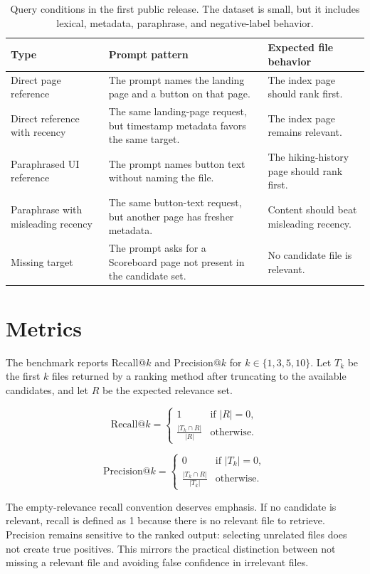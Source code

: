 \documentclass[11pt,a4paper]{article}
\begin{document}
\begin{table}[h]
\centering
\small
\begin{tabularx}{\textwidth}{lXl}
\toprule
Type & Prompt pattern & Expected file behavior \\
\midrule
Direct page reference & The prompt names the landing page and a button on that
page. & The index page should rank first. \\
Direct reference with recency & The same landing-page request, but timestamp
metadata favors the same target. & The index page remains relevant. \\
Paraphrased UI reference & The prompt names button text without naming the
file. & The hiking-history page should rank first. \\
Paraphrase with misleading recency & The same button-text request, but another
page has fresher metadata. & Content should beat misleading recency. \\
Missing target & The prompt asks for a Scoreboard page not present in the
candidate set. & No candidate file is relevant. \\
\bottomrule
\end{tabularx}
\caption{Query conditions in the first public release. The dataset is small,
but it includes lexical, metadata, paraphrase, and negative-label behavior.}
\label{tab:queries}
\end{table}

\section{Metrics}
\label{sec:metrics}

The benchmark reports Recall@$k$ and Precision@$k$ for
$k \in \{1, 3, 5, 10\}$. Let $T_k$ be the first $k$ files returned by a ranking
method after truncating to the available candidates, and let $R$ be the expected
relevance set.

\[
\mathrm{Recall}@k =
\begin{cases}
1 & \text{if } |R| = 0,\\
\frac{|T_k \cap R|}{|R|} & \text{otherwise.}
\end{cases}
\]

\[
\mathrm{Precision}@k =
\begin{cases}
0 & \text{if } |T_k| = 0,\\
\frac{|T_k \cap R|}{|T_k|} & \text{otherwise.}
\end{cases}
\]

The empty-relevance recall convention deserves emphasis. If no candidate is
relevant, recall is defined as 1 because there is no relevant file to retrieve.
Precision remains sensitive to the ranked output: selecting unrelated files
does not create true positives. This mirrors the practical distinction between
not missing a relevant file and avoiding false confidence in irrelevant files.
\end{document}
